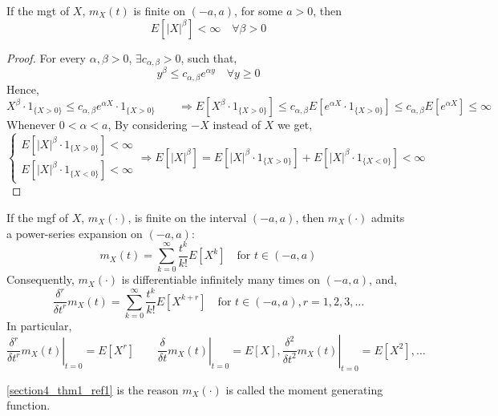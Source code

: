 \begin{theorem}
    If the mgt of $X$, $m_X(t)$ is finite on $(-a, a)$, for some $a > 0$, then
    \[ E[\vert X \vert^\beta] < \infty \quad \forall \beta > 0              \]
\end{theorem}
\begin{proof}
    For every $\alpha, \beta > 0$, $\exists c_{\alpha, \beta} > 0$, such that,
    \[ y^\beta \leq c_{\alpha, \beta} e^{\alpha y} \quad \forall y \geq 0   \]
    Hence,
    \[ X^\beta \cdot 1_{\lbrace X > 0 \rbrace} \leq
           c_{\alpha, \beta} e^{\alpha X} \cdot 1_{\lbrace X > 0 \rbrace}
       \qquad \Rightarrow
       E[X^\beta \cdot 1_{\lbrace X > 0 \rbrace}]
       \leq c_{\alpha, \beta} E[e^{\alpha X} \cdot 1_{\lbrace X > 0 \rbrace}]
       \leq c_{\alpha, \beta} E[e^{\alpha X}]
       \leq \infty
    \]
    Whenever $0 < \alpha < a$, By considering $-X$ instead of $X$ we get,
    \[ \begin{cases}
           E[\vert X \vert^\beta \cdot 1_{\lbrace X > 0 \rbrace}] < \infty   \\
           E[\vert X \vert^\beta \cdot 1_{\lbrace X < 0 \rbrace}] < \infty
       \end{cases}
       \Rightarrow
       E[\vert X \vert^\beta] =
           E[\vert X \vert^\beta \cdot 1_{\lbrace X > 0 \rbrace}] +
           E[\vert X \vert^\beta \cdot 1_{\lbrace X < 0 \rbrace}]
       < \infty                                                              \]
\end{proof}

\begin{theorem}
    If the mgf of $X$, $m_X(\cdot)$, is finite on the interval $(-a, a)$, then
$m_X(\cdot)$ admits a power-series expansion on $(-a, a)$:
\begin{equation}
    \label{section4_thm1_ref1}
    m_X(t) = \sum_{k = 0}^\infty \frac{t^k}{k!} E[X^k]
    \quad \text{for } t \in (-a, a)
\end{equation}
   Consequently, $m_X(\cdot)$ is differentiable infinitely many times on $(-a,
a)$, and,
\[   \frac{\delta^r}{\delta t^r} m_X(t)
   = \sum_{k = 0}^\infty \frac{t^k}{k!} E[X^{k+r}]
   \quad \text{for } t \in (-a, a), r = 1, 2, 3, \dots                      \]
    In particular,
\[        \left. \frac{\delta^r}{\delta t^r} m_X(t) \right\vert_{t = 0} =E[X^r]
   \qquad \left. \frac{\delta}{\delta t} m_X(t) \right\vert_{t = 0} = E[X],
          \left. \frac{\delta^2}{\delta t^2} m_X(t) \right
              \vert_{t = 0} = E[X^2],
          \dots                                                             \]
\end{theorem}
\note \ref{section4_thm1_ref1} is the reason $m_X(\cdot)$ is called the moment
generating function.

